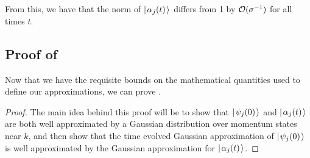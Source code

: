 \documentclass[../thesis-main/thesis-main]{subfiles}
\begin{document}
From this, we have that the norm of 	$|\mspace{2mu} \alpha_j(t) \mspace{2mu} \rangle$ differs from 1 by  $\mathcal{O}(\sigma^{-1})$ for all times $t$.


\subsection{Proof of }

Now that we have the requisite bounds on the mathematical quantities used to define our approximations, we can prove .


\begin{proof}



The main idea behind this proof will be to show that $|\mspace{2mu} \psi_j(0) \mspace{2mu} \rangle$ and $|\mspace{2mu} \alpha_j(t) \mspace{2mu} \rangle$ are both well approximated by a Gaussian distribution over momentum states near $k$, and then show that the time evolved Gaussian approximation of $|\mspace{2mu} \psi_j(0) \mspace{2mu} \rangle$ is well approximated by the Gaussian approximation for $|\mspace{2mu} \alpha_j(t) \mspace{2mu} \rangle$.  


\end{proof}
\end{document}
